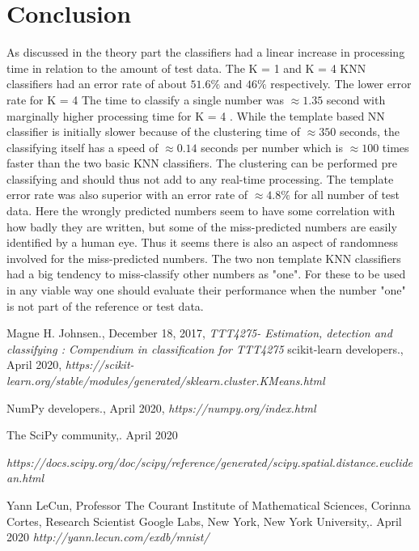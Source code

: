 \documentclass{article}
\begin{document}
\section{Conclusion}
As discussed in the theory part the classifiers had a linear increase in processing time in relation to the amount of test data. The K = 1 and K = 4 KNN classifiers had an error rate of about $51.6\%$ and $46\%$ respectively. The lower error rate for K = 4  The time to classify a single number was $\approx 1.35$ second with marginally higher processing time for K = 4 .  
While the template based NN classifier is initially slower because of the clustering time of $\approx 350$ seconds, the classifying itself has a speed of $\approx 0.14$ seconds per number which is $\approx 100$ times faster than the two basic KNN classifiers. The clustering can be performed pre classifying and should thus not add to any real-time processing. The template error rate was also superior with an error rate of $\approx 4.8\%$ for all number of test data. Here the wrongly predicted numbers seem to have some correlation with how badly they are written, but some of the miss-predicted numbers are easily identified by a human eye. Thus it seems there is also an aspect of randomness involved for the miss-predicted numbers.  
The two non template KNN classifiers had a big tendency to miss-classify other numbers as "one". For these to be used in any viable way one should evaluate their performance when the number "one" is not part of the reference or test data.

\begin{thebibliography}{99}
    
  Magne H. Johnsen., December 18, 2017, \emph{TTT4275- Estimation, detection and classifying
: Compendium in classification for TTT4275}
scikit-learn developers., April 2020, \emph{https://scikit-learn.org/stable/modules/generated/sklearn.cluster.KMeans.html}

NumPy developers., April 2020, \emph{https://numpy.org/index.html}

The SciPy community,. April 2020

\emph{https://docs.scipy.org/doc/scipy/reference/generated/scipy.spatial.distance.euclidean.html}

Yann LeCun, Professor
The Courant Institute of Mathematical Sciences, Corinna Cortes, Research Scientist
Google Labs, New York,
New York University,. April 2020
\emph{http://yann.lecun.com/exdb/mnist/}
\end{thebibliography}
\end{document}
